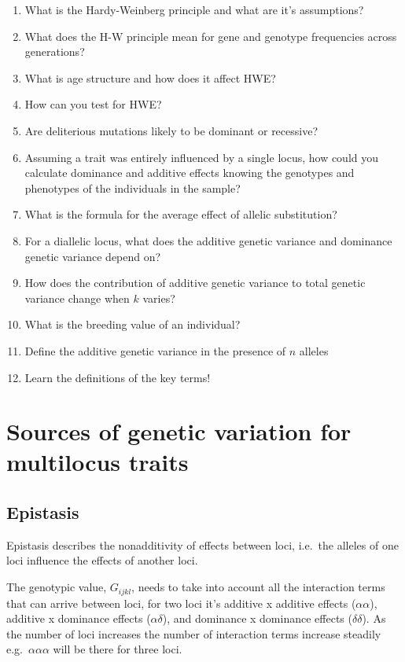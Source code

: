 \documentclass[
]{book}
\providecommand{\tightlist}{%
  \setlength{\itemsep}{0pt}\setlength{\parskip}{0pt}}
\begin{document}
\begin{enumerate}
\def\labelenumi{\arabic{enumi}.}
\tightlist
\item
  What is the Hardy-Weinberg principle and what are it's assumptions?
\item
  What does the H-W principle mean for gene and genotype frequencies across generations?
\item
  What is age structure and how does it affect HWE?
\item
  How can you test for HWE?
\item
  Are deliterious mutations likely to be dominant or recessive?
\item
  Assuming a trait was entirely influenced by a single locus, how could you calculate dominance and additive effects knowing the genotypes and phenotypes of the individuals in the sample?
\item
  What is the formula for the average effect of allelic substitution?
\item
  For a diallelic locus, what does the additive genetic variance and dominance genetic variance depend on?
\item
  How does the contribution of additive genetic variance to total genetic variance change when \(k\) varies?
\item
  What is the breeding value of an individual?
\item
  Define the additive genetic variance in the presence of \(n\) alleles
\item
  Learn the definitions of the key terms!
\end{enumerate}

\hypertarget{sources-of-genetic-variation-for-multilocus-traits}{%
\chapter{Sources of genetic variation for multilocus traits}\label{sources-of-genetic-variation-for-multilocus-traits}}

\hypertarget{epistasis}{%
\section{Epistasis}\label{epistasis}}

Epistasis describes the nonadditivity of effects between loci, i.e.~the alleles of one loci influence the effects of another loci.

The genotypic value, \(G_{ijkl}\), needs to take into account all the interaction terms that can arrive between loci, for two loci it's additive x additive effects (\(\alpha\alpha\)), additive x dominance effects (\(\alpha\delta\)), and dominance x dominance effects (\(\delta\delta\)). As the number of loci increases the number of interaction terms increase steadily e.g.~\(\alpha\alpha\alpha\) will be there for three loci.
\end{document}
